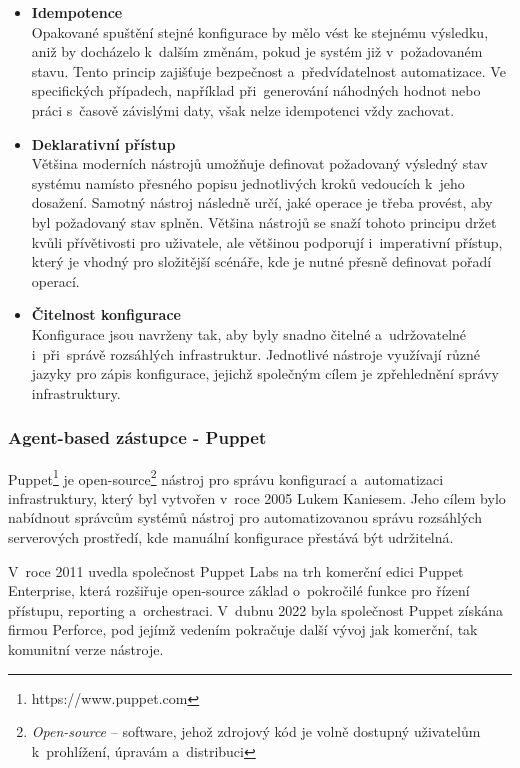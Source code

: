 \begin{itemize}
\item \textbf{Idempotence} \\
Opakované spuštění stejné konfigurace by mělo vést ke stejnému výsledku, aniž by docházelo k~dalším změnám, pokud je systém již v~požadovaném stavu. 
Tento princip zajišťuje bezpečnost a~předvídatelnost automatizace. 
Ve specifických případech, například při~generování náhodných hodnot nebo práci s~časově závislými daty, však nelze idempotenci vždy zachovat.
\cite{hochstein2017ansible}

\item \textbf{Deklarativní přístup} \\
Většina moderních nástrojů umožňuje definovat požadovaný výsledný stav systému namísto přesného popisu jednotlivých kroků vedoucích k~jeho dosažení. 
Samotný nástroj následně určí, jaké operace je třeba provést, aby byl požadovaný stav splněn.
Většina nástrojů se snaží tohoto principu držet kvůli přívětivosti pro uživatele, ale většinou podporují i~imperativní přístup, který je vhodný pro složitější scénáře, kde je nutné přesně definovat pořadí operací.
\cite{hochstein2017ansible}

\item \textbf{Čitelnost konfigurace} \\
Konfigurace jsou navrženy tak, aby byly snadno čitelné a~udržovatelné i~při~správě rozsáhlých infrastruktur. 
Jednotlivé nástroje využívají různé jazyky pro zápis konfigurace, jejichž společným cílem je zpřehlednění správy infrastruktury.
\cite{hochstein2017ansible}

\end{itemize}
\clearpage
\subsubsection{Agent-based zástupce - Puppet}
Puppet\footnote{https://www.puppet.com} je open-source\footnote{\textit{Open-source} – software, jehož zdrojový kód je volně dostupný uživatelům k~prohlížení, úpravám a~distribuci} nástroj pro správu konfigurací a~automatizaci infrastruktury, který byl vytvořen v~roce 2005 Lukem Kaniesem. 
Jeho cílem bylo nabídnout správcům systémů nástroj pro automatizovanou správu rozsáhlých serverových prostředí, kde manuální konfigurace přestává být udržitelná. 
\cite{puppetdocs}

V~roce 2011 uvedla společnost Puppet Labs na trh komerční edici Puppet Enterprise, která rozšiřuje open-source základ o~pokročilé funkce pro řízení přístupu, reporting a~orchestraci. 
V~dubnu 2022 byla společnost Puppet získána firmou Perforce, pod jejímž vedením pokračuje další vývoj jak komerční, tak komunitní verze nástroje. 

